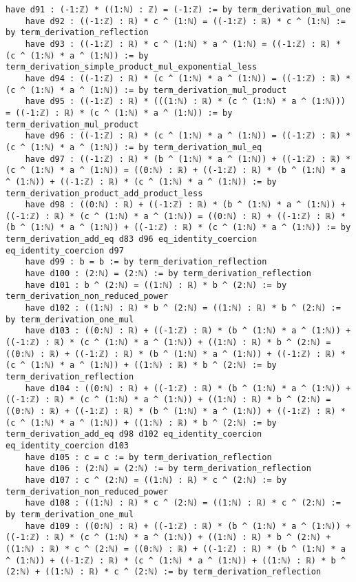 \documentclass{article}
\begin{document}
\begin{tcolorbox}[colback=white!10, width=\linewidth]
\begin{lstlisting}[language=Lean4]
    have d91 : (-1:ℤ) * ((1:ℕ) : ℤ) = (-1:ℤ) := by term_derivation_mul_one
    have d92 : ((-1:ℤ) : ℝ) * c ^ (1:ℕ) = ((-1:ℤ) : ℝ) * c ^ (1:ℕ) := by term_derivation_reflection
    have d93 : ((-1:ℤ) : ℝ) * c ^ (1:ℕ) * a ^ (1:ℕ) = ((-1:ℤ) : ℝ) * (c ^ (1:ℕ) * a ^ (1:ℕ)) := by term_derivation_simple_product_mul_exponential_less
    have d94 : ((-1:ℤ) : ℝ) * (c ^ (1:ℕ) * a ^ (1:ℕ)) = ((-1:ℤ) : ℝ) * (c ^ (1:ℕ) * a ^ (1:ℕ)) := by term_derivation_mul_product
    have d95 : ((-1:ℤ) : ℝ) * (((1:ℕ) : ℝ) * (c ^ (1:ℕ) * a ^ (1:ℕ))) = ((-1:ℤ) : ℝ) * (c ^ (1:ℕ) * a ^ (1:ℕ)) := by term_derivation_mul_product
    have d96 : ((-1:ℤ) : ℝ) * (c ^ (1:ℕ) * a ^ (1:ℕ)) = ((-1:ℤ) : ℝ) * (c ^ (1:ℕ) * a ^ (1:ℕ)) := by term_derivation_mul_eq
    have d97 : ((-1:ℤ) : ℝ) * (b ^ (1:ℕ) * a ^ (1:ℕ)) + ((-1:ℤ) : ℝ) * (c ^ (1:ℕ) * a ^ (1:ℕ)) = ((0:ℕ) : ℝ) + ((-1:ℤ) : ℝ) * (b ^ (1:ℕ) * a ^ (1:ℕ)) + ((-1:ℤ) : ℝ) * (c ^ (1:ℕ) * a ^ (1:ℕ)) := by term_derivation_product_add_product_less
    have d98 : ((0:ℕ) : ℝ) + ((-1:ℤ) : ℝ) * (b ^ (1:ℕ) * a ^ (1:ℕ)) + ((-1:ℤ) : ℝ) * (c ^ (1:ℕ) * a ^ (1:ℕ)) = ((0:ℕ) : ℝ) + ((-1:ℤ) : ℝ) * (b ^ (1:ℕ) * a ^ (1:ℕ)) + ((-1:ℤ) : ℝ) * (c ^ (1:ℕ) * a ^ (1:ℕ)) := by term_derivation_add_eq d83 d96 eq_identity_coercion eq_identity_coercion d97
    have d99 : b = b := by term_derivation_reflection
    have d100 : (2:ℕ) = (2:ℕ) := by term_derivation_reflection
    have d101 : b ^ (2:ℕ) = ((1:ℕ) : ℝ) * b ^ (2:ℕ) := by term_derivation_non_reduced_power
    have d102 : ((1:ℕ) : ℝ) * b ^ (2:ℕ) = ((1:ℕ) : ℝ) * b ^ (2:ℕ) := by term_derivation_one_mul
    have d103 : ((0:ℕ) : ℝ) + ((-1:ℤ) : ℝ) * (b ^ (1:ℕ) * a ^ (1:ℕ)) + ((-1:ℤ) : ℝ) * (c ^ (1:ℕ) * a ^ (1:ℕ)) + ((1:ℕ) : ℝ) * b ^ (2:ℕ) = ((0:ℕ) : ℝ) + ((-1:ℤ) : ℝ) * (b ^ (1:ℕ) * a ^ (1:ℕ)) + ((-1:ℤ) : ℝ) * (c ^ (1:ℕ) * a ^ (1:ℕ)) + ((1:ℕ) : ℝ) * b ^ (2:ℕ) := by term_derivation_reflection
    have d104 : ((0:ℕ) : ℝ) + ((-1:ℤ) : ℝ) * (b ^ (1:ℕ) * a ^ (1:ℕ)) + ((-1:ℤ) : ℝ) * (c ^ (1:ℕ) * a ^ (1:ℕ)) + ((1:ℕ) : ℝ) * b ^ (2:ℕ) = ((0:ℕ) : ℝ) + ((-1:ℤ) : ℝ) * (b ^ (1:ℕ) * a ^ (1:ℕ)) + ((-1:ℤ) : ℝ) * (c ^ (1:ℕ) * a ^ (1:ℕ)) + ((1:ℕ) : ℝ) * b ^ (2:ℕ) := by term_derivation_add_eq d98 d102 eq_identity_coercion eq_identity_coercion d103
    have d105 : c = c := by term_derivation_reflection
    have d106 : (2:ℕ) = (2:ℕ) := by term_derivation_reflection
    have d107 : c ^ (2:ℕ) = ((1:ℕ) : ℝ) * c ^ (2:ℕ) := by term_derivation_non_reduced_power
    have d108 : ((1:ℕ) : ℝ) * c ^ (2:ℕ) = ((1:ℕ) : ℝ) * c ^ (2:ℕ) := by term_derivation_one_mul
    have d109 : ((0:ℕ) : ℝ) + ((-1:ℤ) : ℝ) * (b ^ (1:ℕ) * a ^ (1:ℕ)) + ((-1:ℤ) : ℝ) * (c ^ (1:ℕ) * a ^ (1:ℕ)) + ((1:ℕ) : ℝ) * b ^ (2:ℕ) + ((1:ℕ) : ℝ) * c ^ (2:ℕ) = ((0:ℕ) : ℝ) + ((-1:ℤ) : ℝ) * (b ^ (1:ℕ) * a ^ (1:ℕ)) + ((-1:ℤ) : ℝ) * (c ^ (1:ℕ) * a ^ (1:ℕ)) + ((1:ℕ) : ℝ) * b ^ (2:ℕ) + ((1:ℕ) : ℝ) * c ^ (2:ℕ) := by term_derivation_reflection

\end{lstlisting}
\end{tcolorbox}
\end{document}
